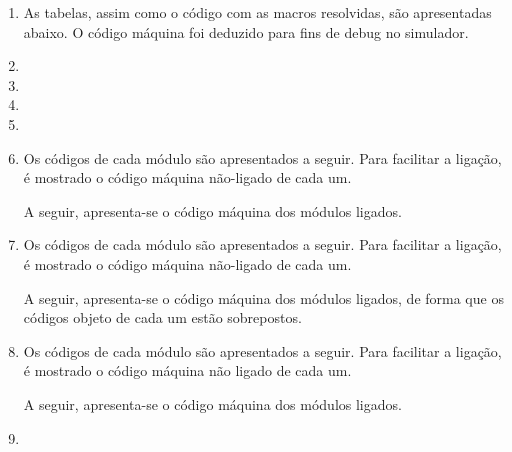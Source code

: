\begin{enumerate}
    \item
    As tabelas, assim como o código com as macros resolvidas, são apresentadas abaixo.
    O código máquina foi deduzido para fins de debug no simulador.

    
    \item

    \item

    \item 
    
    \item


    \item
    Os códigos de cada módulo são apresentados a seguir.
    Para facilitar a ligação, é mostrado 
    o código máquina não-ligado de cada um.

    A seguir, apresenta-se o código máquina dos módulos ligados.

    \item
    Os códigos de cada módulo são apresentados a seguir.
    Para facilitar a ligação, é mostrado 
    o código máquina não-ligado de cada um.

    A seguir, apresenta-se o código máquina dos módulos ligados,
    de forma que os códigos objeto de cada um estão sobrepostos.

    \item
    Os códigos de cada módulo são apresentados a seguir.
    Para facilitar a ligação, é mostrado 
    o código máquina não ligado de cada um.

    A seguir, apresenta-se o código máquina dos módulos ligados.

    \item
\end{enumerate}